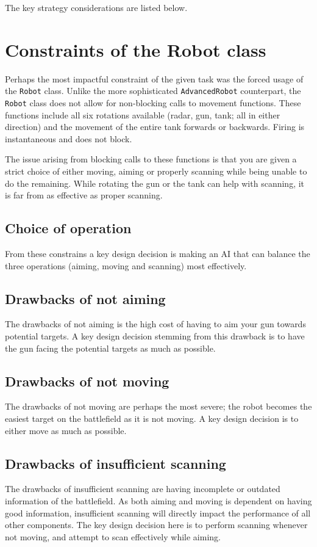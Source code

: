 \documentclass[11pt]{report}
\begin{document}
The key strategy considerations are listed below.

\section{Constraints of the Robot class}
Perhaps the most impactful constraint of the given task was the forced usage of the \texttt{Robot} class. Unlike the more sophisticated \texttt{AdvancedRobot} counterpart, the \texttt{Robot} class does not allow for non-blocking calls to movement functions. These functions include all six rotations available (radar, gun, tank; all in either direction) and the movement of the entire tank forwards or backwards. Firing is instantaneous and does not block.

The issue arising from blocking calls to these functions is that you are given a strict choice of either moving, aiming or properly scanning while being unable to do the remaining. While rotating the gun or the tank can help with scanning, it is far from as effective as proper scanning.

\subsection{Choice of operation}
From these constrains a key design decision is making an AI that can balance the three operations (aiming, moving and scanning) most effectively.

\subsection{Drawbacks of not aiming}
The drawbacks of not aiming is the high cost of having to aim your gun towards potential targets. A key design decision stemming from this drawback is to have the gun facing the potential targets as much as possible.

\subsection{Drawbacks of not moving}
The drawbacks of not moving are perhaps the most severe; the robot becomes the easiest target on the battlefield as it is not moving. A key design decision is to either move as much as possible.

\subsection{Drawbacks of insufficient scanning}
The drawbacks of insufficient scanning are having incomplete or outdated information of the battlefield. As both aiming and moving is dependent on having good information, insufficient scanning will directly impact the performance of all other components. The key design decision here is to perform scanning whenever not moving, and attempt to scan effectively while aiming.
\end{document}
